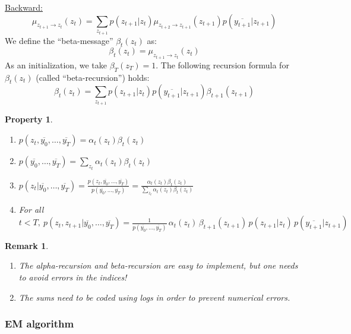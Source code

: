 \documentclass[12pt,a4paper]{report}
\newtheorem{Rq}[lemma]{Remark}
\newtheorem{property}[lemma]{Property}
\begin{document}
\newline
\underline{Backward:}
\begin{equation*}
\mu_{z_{t+1}\rightarrow z_{t}}(z_t) = \sum_{z_{t+1}} p(z_{t+1}|z_t) \mu_{z_{t+2} \rightarrow z_{t+1}}(z_{t+1})p(\overline{y_{t+1}} | z_{t+1}) 
\end{equation*}
We define the ``beta-message'' $\beta_t(z_t)$ as:
\begin{equation*}
\beta_t(z_t) = \mu_{z_{t+1}\rightarrow z_{t}}(z_t)
\end{equation*}
As an initialization, we take $\beta_{T}(z_T) = 1$.
The following recursion formula for $\beta_t(z_t)$ (called ``beta-recursion'') holds:
\begin{equation*}
\beta_{t}(z_t) = \sum_{z_{t+1}} p(z_{t+1}| z_t) p(\overline{y_{t+1}} | z_{t+1}) \beta_{t+1}(z_{t+1})
\end{equation*}
\begin{property}
\begin{enumerate}
\item $p(z_t, \overline{y_0},\ldots,\overline{y_T}) = \alpha_t(z_t) \beta_t(z_t)$
\item $p(\overline{y_0},\ldots,\overline{y_T}) = \underset{z_t}{\sum}\alpha_{t}(z_t)\beta_{t}(z_t)$
\item $p(z_t|\overline{y_0},\ldots,\overline{y_T}) = \frac{p(z_t, \overline{y_0},\dots,\overline{y_T})}{p(\overline{y_0},\dots,\overline{y_T})} = \frac{\alpha_t(z_t)\beta_t(z_t)}{\underset{z_t}{\sum}\alpha_{t}(z_t)\beta_{t}(z_t)}$
\item For all $t < T, \: p(z_{t},z_{t+1}|\overline{y_0},\dots,\overline{y_T})=\frac{1}{p(\overline{y_0},\dots,\overline{y_T})} \,\alpha_t(z_t)\,\beta_{t+1}(z_{t+1})\,p(z_{t+1}|z_t) \,p(\overline{y_{t+1}}|z_{t+1})$
\end{enumerate}
\end{property}
\begin{Rq}
\begin{enumerate}
\item The alpha-recursion and beta-recursion are easy to implement, but one needs to avoid errors in the indices!
\item The sums need to be coded using logs in order to prevent numerical errors.
\end{enumerate}
\end{Rq}

\subsubsection{EM algorithm}
\end{document}
